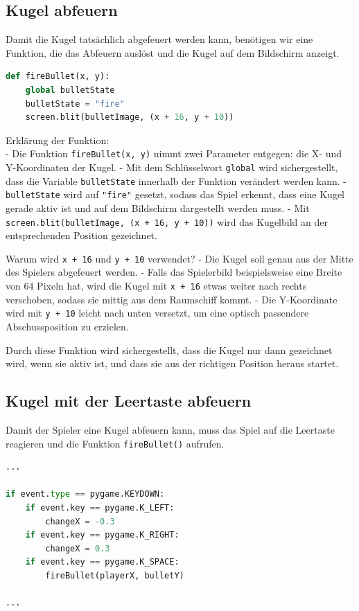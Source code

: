\documentclass{article}
\begin{document}
\subsection{Kugel abfeuern}
Damit die Kugel tatsächlich abgefeuert werden kann, benötigen wir eine Funktion, die das Abfeuern auslöst und die Kugel auf dem Bildschirm anzeigt.

\begin{lstlisting}[style=pythonstyle, language=Python]
def fireBullet(x, y):
    global bulletState
    bulletState = "fire"
    screen.blit(bulletImage, (x + 16, y + 10))
\end{lstlisting}

Erklärung der Funktion:\\
- Die Funktion \texttt{fireBullet(x, y)} nimmt zwei Parameter entgegen: die X- und Y-Koordinaten der Kugel.  
- Mit dem Schlüsselwort \texttt{global} wird sichergestellt, dass die Variable \texttt{bulletState} innerhalb der Funktion verändert werden kann.  
- \texttt{bulletState} wird auf \texttt{"fire"} gesetzt, sodass das Spiel erkennt, dass eine Kugel gerade aktiv ist und auf dem Bildschirm dargestellt werden muss.  
- Mit \texttt{screen.blit(bulletImage, (x + 16, y + 10))} wird das Kugelbild an der entsprechenden Position gezeichnet.

Warum wird \texttt{x + 16} und \texttt{y + 10} verwendet?
- Die Kugel soll genau aus der Mitte des Spielers abgefeuert werden.  
- Falls das Spielerbild beispielsweise eine Breite von 64 Pixeln hat, wird die Kugel mit \texttt{x + 16} etwas weiter nach rechts verschoben, sodass sie mittig aus dem Raumschiff kommt.  
- Die Y-Koordinate wird mit \texttt{y + 10} leicht nach unten versetzt, um eine optisch passendere Abschussposition zu erzielen.

Durch diese Funktion wird sichergestellt, dass die Kugel nur dann gezeichnet wird, wenn sie aktiv ist, und dass sie aus der richtigen Position heraus startet.

\subsection{Kugel mit der Leertaste abfeuern}
Damit der Spieler eine Kugel abfeuern kann, muss das Spiel auf die Leertaste reagieren und die Funktion \texttt{fireBullet()} aufrufen.

\begin{lstlisting}[style=pythonstyle, language=Python]
...

if event.type == pygame.KEYDOWN:
	if event.key == pygame.K_LEFT:
        changeX = -0.3
    if event.key == pygame.K_RIGHT:
        changeX = 0.3
    if event.key == pygame.K_SPACE:
        fireBullet(playerX, bulletY)
        
...
\end{lstlisting}
\end{document}
